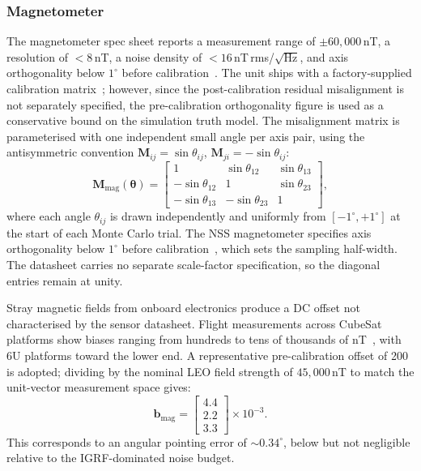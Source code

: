 \subsubsection*{Magnetometer}

The magnetometer spec sheet reports a measurement range of $\pm60{,}000$\,nT,
a resolution of $<8$\,nT, a noise density of $<16$\,nT\,rms/$\sqrt{\text{Hz}}$,
and axis orthogonality below $1^\circ$ before calibration~\cite{NSS_MAG}.
The unit ships with a factory-supplied calibration matrix~\cite{NSS_MAG};
however, since the post-calibration residual misalignment is not separately
specified, the pre-calibration orthogonality figure is used as a conservative
bound on the simulation truth model.  The misalignment matrix is parameterised with one independent small angle per
axis pair, using the antisymmetric convention
$\mathbf{M}_{ij} = \sin\theta_{ij}$, $\mathbf{M}_{ji} = -\sin\theta_{ij}$:
\begin{equation}
  \mathbf{M}_\mathrm{mag}(\boldsymbol{\theta})
  =
  \begin{bmatrix}
    1             &  \sin\theta_{12} &  \sin\theta_{13} \\
   -\sin\theta_{12} &  1             &  \sin\theta_{23} \\
   -\sin\theta_{13} & -\sin\theta_{23} &  1
  \end{bmatrix},
\end{equation}
where each angle $\theta_{ij}$ is drawn independently and uniformly from
$[-1^\circ,+1^\circ]$ at the start of each Monte Carlo trial.
The NSS magnetometer specifies axis orthogonality below $1^\circ$ before
calibration~\cite{NSS_MAG}, which sets the sampling half-width.
The datasheet carries no separate scale-factor specification, so the diagonal
entries remain at unity.

Stray magnetic fields from onboard electronics produce a DC offset not
characterised by the sensor datasheet.  Flight measurements across CubeSat
platforms show biases ranging from hundreds to tens of thousands of
nT~\cite{Hoffmann2023}, with 6U platforms toward the lower end.  A
representative pre-calibration offset of 200\,is
adopted; dividing by the nominal LEO field strength of $45{,}000$\,nT to
match the unit-vector measurement space gives:
\begin{equation}
  \mathbf{b}_\mathrm{mag}
  = \begin{bmatrix} 4.4 \\ 2.2 \\ 3.3 \end{bmatrix} \times 10^{-3}.
\end{equation}
This corresponds to an angular pointing error of $\sim\!0.34^\circ$, below
but not negligible relative to the IGRF-dominated noise budget.

